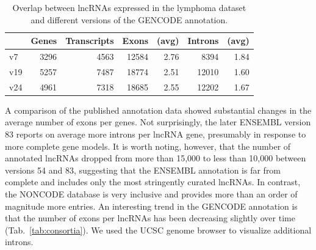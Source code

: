\documentclass[ncrna,article,submit,moreauthors,pdftex,10pt,a4paper]{mdpi}
\begin{document}
\begin{table}[ht]
  \caption{Overlap between lncRNAs expressed in the lymphoma dataset 
    and different versions of the GENCODE annotation.} 
\label{tab:gencode}
\begin{center}\small
\begin{tabular}{|l|rr|rr|rr|}
  \hline
  & Genes & Transcripts & Exons & (avg) & Introns & (avg) \\ 
   \hline
  v7  & 3296 & 4563 & 12584 & 2.76 &  8394 & 1.84 \\
  v19 & 5257 & 7487 & 18774 & 2.51 & 12010 & 1.60 \\
  v24 & 4961 & 7318 & 18685 & 2.55 & 12202 & 1.67 \\ 
   \hline
\end{tabular}
\end{center}
\end{table}

A comparison of the published annotation data showed substantial changes in
the average number of exons per genes. Not surprisingly, the later ENSEMBL
version 83 reports on average more introns per lncRNA gene, presumably in
response to more complete gene models. It is worth noting, however, that
the number of annotated lncRNAs dropped from more than 15,000 to less than
10,000 between versions 54 and 83, suggesting that the ENSEMBL annotation
is far from complete and includes only the most stringently curated
lncRNAs. In contrast, the NONCODE database is very inclusive and provides
more than an order of magnitude more entries. An interesting trend in the
GENCODE annotation is that the number of exons per lncRNAs has been
decreasing slightly over time (Tab.~\ref{tab:consortia}).  We used the UCSC
genome browser \cite{Kent:02} to visualize additional introns.

\vspace{6pt} 




\end{document}
